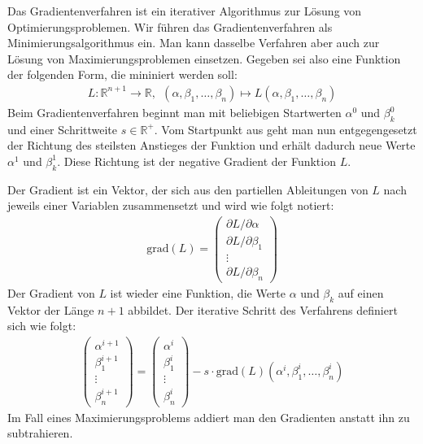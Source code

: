 Das Gradientenverfahren ist ein iterativer Algorithmus zur Lösung von Optimierungsproblemen. Wir führen das Gradientenverfahren als Minimierungsalgorithmus ein. Man kann dasselbe Verfahren aber auch zur Lösung von Maximierungsproblemen einsetzen. Gegeben sei also eine Funktion der folgenden Form, die mininiert werden soll:
\begin{align*}
    L: \mathbb{R}^{n+1} \rightarrow \mathbb{R},~~ (\alpha, \beta_1, \dots, \beta_n) \mapsto L(\alpha, \beta_1, \dots, \beta_n)
\end{align*}
Beim Gradientenverfahren beginnt man mit beliebigen Startwerten $\alpha^0$ und $\beta_k^0$ und einer Schrittweite $s \in \mathbb{R}^+$. Vom Startpunkt aus geht man nun entgegengesetzt der Richtung des steilsten Anstieges der Funktion und erhält dadurch neue Werte $\alpha^1$ und $\beta_k^1$. Diese Richtung ist der negative Gradient der Funktion $L$.

Der Gradient ist ein Vektor, der sich aus den partiellen Ableitungen von $L$ nach jeweils einer Variablen zusammensetzt und wird wie folgt notiert:
\begin{align*}
    \text{grad}(L) = \begin{pmatrix}
        \partial L / \partial \alpha \\
        \partial L / \partial \beta_1 \\
        \vdots \\
        \partial L / \partial \beta_n
    \end{pmatrix}
\end{align*}
Der Gradient von $L$ ist wieder eine Funktion, die Werte $\alpha$ und $\beta_k$ auf einen Vektor der Länge $n+1$ abbildet. Der iterative Schritt des Verfahrens definiert sich wie folgt:
\begin{align*}
    \begin{pmatrix}
        \alpha^{i + 1} \\
        \beta_1^{i + 1} \\
        \vdots \\
        \beta_n^{i + 1}
    \end{pmatrix} = \begin{pmatrix}
        \alpha^i \\
        \beta_1^i \\
        \vdots \\
        \beta_n^i
    \end{pmatrix} - s \cdot \text{grad}(L) (\alpha^i, \beta_1^i, \dots, \beta_n^i)
\end{align*}
Im Fall eines Maximierungsproblems addiert man den Gradienten anstatt ihn zu subtrahieren.

